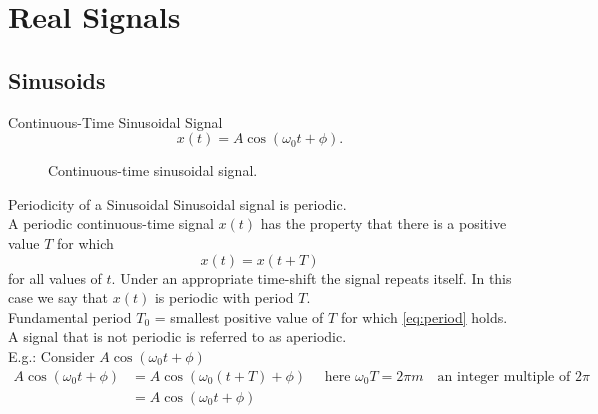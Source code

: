\section{Real Signals}

\subsection{Sinusoids}

\begin{frame}[plain]{Continuous-Time Sinusoidal Signal}
    \begin{equation}\label{eq:cosine}
        x(t) = A\cos(\omega_0 t + \phi).
    \end{equation}


    \begin{figure}
        \centering
        
        \caption{Continuous-time sinusoidal signal.}\label{fi:cosine}
    \end{figure}
\end{frame}

\begin{frame}[plain]{Periodicity of a Sinusoidal}
    Sinusoidal signal is \alert{periodic}.\\
    A periodic continuous-time signal $x(t)$ has the property that  there is a positive value $T$ for which
    \begin{equation}\label{eq:period}
        x(t) = x(t+T)
    \end{equation}
    for all values of $t$. Under an appropriate time-shift the signal repeats itself. In this case we say that $x(t)$ is periodic with period $T$.\\
    \alert{Fundamental period $T_0$} = smallest positive value of $T$ for which \ref{eq:period} holds.\\
    A signal that is not periodic is referred to as \alert{aperiodic}. \\
    E.g.: Consider $A\cos(\omega_0t + \phi)$\\
    \begin{equation*}
        \begin{split}
            A\cos(\omega_0t + \phi) &= A\cos(\omega_0(t + T) + \phi)\quad \text{ here } \omega_0T = 2\pi m \quad \text{an integer multiple of } 2\pi\\
                                    &= A\cos(\omega_0t + \phi)\\
        \end{split}
    \end{equation*}

\end{frame}


